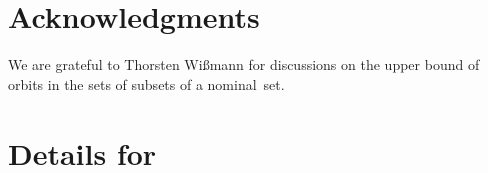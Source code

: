 \documentclass[10pt, final, conference, a4paper, twocolumn]{IEEEtran}
\begin{document}
\section*{Acknowledgments}
We are grateful to Thorsten Wißmann for discussions on the upper bound of orbits in the sets of subsets of a nominal~set.






\clearpage
\appendices
\onecolumn
\begingroup
{}

\section{Details for~} \label{app:secRANA}
\end{document}
